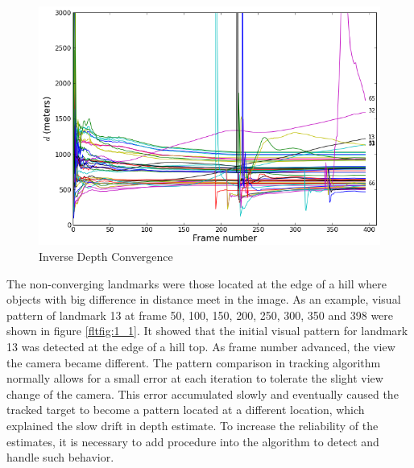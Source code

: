 \begin{figure}[h]
\centering
\includegraphics[width=12cm, keepaspectratio=true]{./Figures/fltfig/cut1/Figure10.png}
\caption{Inverse Depth Convergence}
\label{fltfig:1}
\end{figure}

The non-converging landmarks were those located at the edge of a hill
where objects with big difference in distance meet in the image. As an
example, visual pattern of landmark 13 at frame 50, 100, 150, 200,
250, 300, 350 and 398 were shown in figure \ref{fltfig:1_1}. It showed
that the initial visual pattern for landmark 13 was detected at the
edge of a hill top. As frame number advanced, the view the camera
became different. The pattern comparison in tracking algorithm
normally allows for a small error at each iteration to tolerate the
slight view change of the camera. This error accumulated slowly and
eventually caused the tracked target to become a pattern located at a
different location, which explained the slow drift in depth estimate.
To increase the reliability of the estimates, it is necessary to add
procedure into the algorithm to detect and handle such behavior.

